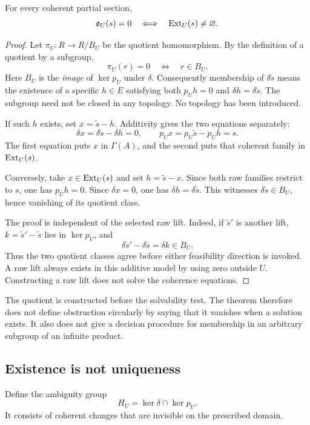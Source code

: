 \begin{theorem}\label{KS09}
For every coherent partial section,
\[
 \mathfrak o_U(s)=0\quad\Longleftrightarrow\quad\operatorname{Ext}_U(s)\ne\varnothing.
\]
\end{theorem}
\begin{proof}
Let $\pi_U:R\to R/B_U$ be the quotient homomorphism. By the definition of a quotient by a subgroup,
\[
 \pi_U(r)=0\quad\Longleftrightarrow\quad r\in B_U.
\]
Here $B_U$ is the \emph{image} of $\ker p_U$ under $\delta$. Consequently membership of $\delta\widetilde s$ means the existence of a specific $h\in E$ satisfying both $p_Uh=0$ and $\delta h=\delta\widetilde s$. The subgroup need not be closed in any topology. No topology has been introduced.

If such $h$ exists, set $x=\widetilde s-h$. Additivity gives the two equations separately:
\[
 \delta x=\delta\widetilde s-\delta h=0,
 \qquad p_Ux=p_U\widetilde s-p_Uh=s.
\]
The first equation puts $x$ in $\Gamma(A)$, and the second puts that coherent family in $\operatorname{Ext}_U(s)$.

Conversely, take $x\in\operatorname{Ext}_U(s)$ and set $h=\widetilde s-x$. Since both raw families restrict to $s$, one has $p_Uh=0$. Since $\delta x=0$, one has $\delta h=\delta\widetilde s$. This witnesses $\delta\widetilde s\in B_U$, hence vanishing of its quotient class.

The proof is independent of the selected raw lift. Indeed, if $\widetilde s'$ is another lift, $k=\widetilde s'-\widetilde s$ lies in $\ker p_U$, and
\[
 \delta\widetilde s'-\delta\widetilde s=\delta k\in B_U.
\]
Thus the two quotient classes agree before either feasibility direction is invoked. A raw lift always exists in this additive model by using zero outside $U$. Constructing a raw lift does not solve the coherence equations.
\end{proof}
The quotient is constructed before the solvability test. The theorem therefore does not define obstruction circularly by saying that it vanishes when a solution exists. It also does not give a decision procedure for membership in an arbitrary subgroup of an infinite product.


\subsection{Existence is not uniqueness}
Define the ambiguity group
\[
 H_U=\ker\delta\cap\ker p_U.
\]
It consists of coherent changes that are invisible on the prescribed domain.

